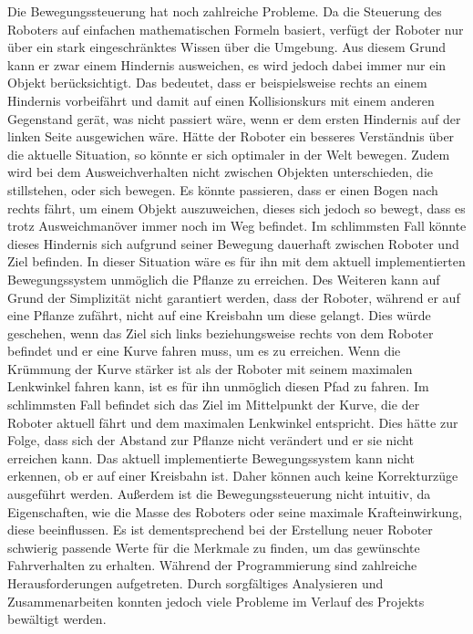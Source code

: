 Die Bewegungssteuerung hat noch zahlreiche Probleme. Da die Steuerung des Roboters auf einfachen mathematischen Formeln basiert, verfügt der Roboter nur über ein stark eingeschränktes Wissen über die Umgebung. Aus diesem Grund kann er zwar einem Hindernis ausweichen, es wird jedoch dabei immer nur ein Objekt berücksichtigt. Das bedeutet, dass er beispielsweise rechts an einem Hindernis vorbeifährt und damit auf einen Kollisionskurs mit einem anderen Gegenstand gerät, was nicht passiert wäre, wenn er dem ersten Hindernis auf der linken Seite ausgewichen wäre. Hätte der Roboter ein besseres Verständnis über die aktuelle Situation, so könnte er sich optimaler in der Welt bewegen. Zudem wird bei dem Ausweichverhalten nicht zwischen Objekten unterschieden, die stillstehen, oder sich bewegen. Es könnte passieren, dass er einen Bogen nach rechts fährt, um einem Objekt auszuweichen, dieses sich jedoch so bewegt, dass es trotz Ausweichmanöver immer noch im Weg befindet. Im schlimmsten Fall könnte dieses Hindernis sich aufgrund seiner Bewegung dauerhaft zwischen Roboter und Ziel befinden. In dieser Situation wäre es für ihn mit dem aktuell implementierten Bewegungssystem unmöglich die Pflanze zu erreichen.
Des Weiteren kann auf Grund der Simplizität nicht garantiert werden, dass der Roboter, während er auf eine Pflanze zufährt, nicht auf eine Kreisbahn um diese gelangt. Dies würde geschehen, wenn das Ziel sich links beziehungsweise rechts von dem Roboter befindet und er eine Kurve fahren muss, um es zu erreichen. Wenn die Krümmung der Kurve stärker ist als der Roboter mit seinem maximalen Lenkwinkel fahren kann, ist es für ihn unmöglich diesen Pfad zu fahren. Im schlimmsten Fall befindet sich das Ziel im Mittelpunkt der Kurve, die der Roboter aktuell fährt und dem maximalen Lenkwinkel entspricht. Dies hätte zur Folge, dass sich der Abstand zur Pflanze nicht verändert und er sie nicht erreichen kann. Das aktuell implementierte Bewegungssystem kann nicht erkennen, ob er auf einer Kreisbahn ist. Daher können auch keine Korrekturzüge ausgeführt werden.
Außerdem ist die Bewegungssteuerung nicht intuitiv, da Eigenschaften, wie die Masse des Roboters oder seine maximale Krafteinwirkung, diese beeinflussen. Es ist dementsprechend bei der Erstellung neuer Roboter schwierig passende Werte für die Merkmale zu finden, um das gewünschte Fahrverhalten zu erhalten.
Während der Programmierung sind zahlreiche Herausforderungen aufgetreten. Durch sorgfältiges Analysieren und Zusammenarbeiten konnten jedoch viele Probleme im Verlauf des Projekts bewältigt werden.
